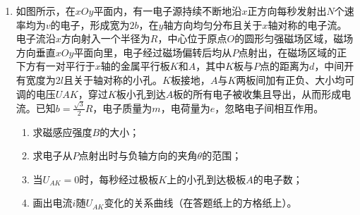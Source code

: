 \begin{enumerate}[leftmargin=0em]
\begin{enumerate}
\end{enumerate}
\begin{figure}[h!]
\flushright

\end{figure}




\item
{}
如图所示，在$ xOy $平面内，有一电子源持续不断地沿$ x $正方向每秒发射出$ N $个速率均为$ v $的电子，形成宽为$ 2b $，在$ y $轴方向均匀分布且关于$ x $轴对称的电子流。电子流沿$ x $方向射入一个半径为$ R $，中心位于原点$ O $的圆形匀强磁场区域，磁场方向垂直$ xOy $平面向里，电子经过磁场偏转后均从$ P $点射出，在磁场区域的正下方有一对平行于$ x $轴的金属平行板$ K $和$ A $，其中$ K $板与$ P $点的距离为$ d $，中间开有宽度为$ 2l $且关于轴对称的小孔。$ K $板接地，$ A $与$ K $两板间加有正负、大小均可调的电压$ UAK $，穿过$ K $板小孔到达$ A $板的所有电子被收集且导出，从而形成电流。已知$b = \frac { \sqrt { 3 } } { 2 } R$，电子质量为$ m $，电荷量为$ e $，忽略电子间相互作用。



\begin{enumerate}
\renewcommand{\labelenumi}{\arabic{enumi}.}
\item
求磁感应强度$ B $的大小；
\item 
求电子从$ P $点射出时与负轴方向的夹角$ \theta $的范围；
\item 
当$ U_{AK}=0 $时，每秒经过极板$ K $上的小孔到达极板$ A $的电子数；
\item 
画出电流$ i $随$ U_{AK} $变化的关系曲线（在答题纸上的方格纸上）。 


\end{enumerate}
\end{enumerate}
